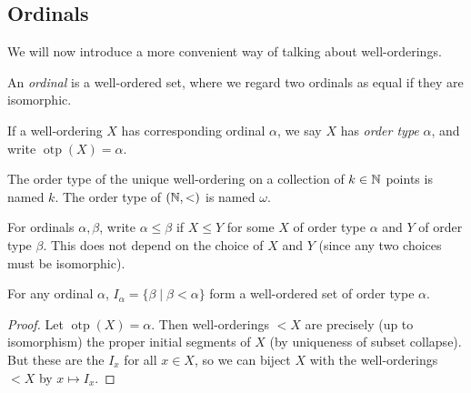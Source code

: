 \documentclass[a3paper, 10pt]{article}
\renewcommand{\vocab}[1]{\emph{#1}}
\begin{document}
\begin{multicols*}{5}
\subsection{Ordinals}

We will now introduce a more convenient way of talking about well-orderings.

\begin{definition}[Ordinal]
  An \vocab{ordinal} is a well-ordered set, where we regard two ordinals as equal if they are isomorphic.
\end{definition}

\begin{definition}
If a well-ordering $X$ has corresponding ordinal $\alpha$, we say $X$ has \vocab{order type} $\alpha$, and write $\operatorname{otp}(X) = \alpha$.
\end{definition}
  
The order type of the unique well-ordering on a collection of $k \in \mathbb{N}$ points is named $k$. The order type of $(\mathbb{N}, <)$ is named $\omega$. 


For ordinals $\alpha, \beta$, write $\alpha \leq \beta$ if $X \leq Y$ for some $X$ of order type $\alpha$ and $Y$ of order type $\beta$. This does not depend on the choice of $X$ and $Y$ (since any two choices must be isomorphic).


\begin{proposition}
  For any ordinal $\alpha$, $I_\alpha = \{\beta \mid \beta < \alpha\}$ form a well-ordered set of order type $\alpha$. 
\end{proposition}
\begin{proof}
  Let $\operatorname{otp}(X) = \alpha$. 
  Then well-orderings $<X$ are precisely (up to isomorphism) the proper initial segments of $X$ (by uniqueness of subset collapse). But these are the $I_x$ for all $x \in X$, so we can biject $X$ with the well-orderings $<X$ by $x \mapsto I_x$.
\end{proof}


\end{multicols*}
\end{document}
